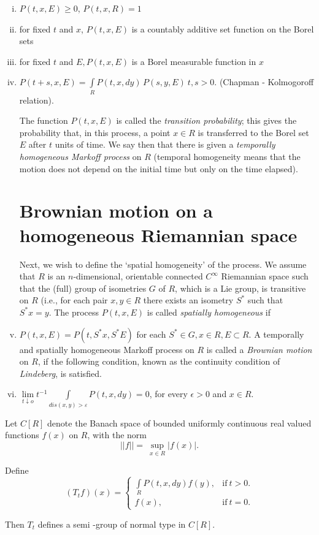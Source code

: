 \begin{enumerate} [i)]
\item $P(t, x, E) \ge 0$, $P(t, x, R) = 1$
\item for fixed $t$ and $x$, $P(t, x, E)$ is a countably additive set
 function on the Borel sets 
\item for fixed $t$ and $E, P(t, x, E)$ is a Borel measurable function
 in $x$ 
\item $P(t + s, x, E) = \int\limits_{R} P(t, x, dy)\, P(s, y, E) ~ t, s
 > 0$. (Chapman - Kolmogoroff relation). 

 The function $P(t, x, E)$ is called the \textit{transition
 probability}; this gives the probability that, in this process, a
 point $x \in R$ is transferred to the Borel set $E$ after $t$ units of
 time. We say then that there is given a \textit{temporally homogeneous
  Markoff process} on $R$ (temporal homogeneity means that the motion
 does not depend on the initial time but only on the time elapsed). 
 
\section{Brownian motion on a homogeneous Riemannian space}\label{chap11:sec2}
 
 Next, we wish to define the `spatial homogeneity' of the process. We
 assume that $R$ is an $n$-dimensional, orientable connected
 $C^\infty$\pageoriginale 
 Riemannian space such that the (full) group of isometries $G$ of $R$,
 which is a Lie group, is transitive on $R$ (i.e., for each pair $x, y
 \in R$ there exists an isometry $S^*$ such that $S^* x = y$. The process
 $P(t, x, E) $ is called \textit{spatially homogeneous} if 
 
\item $P (t, x, E) = P(t, S^*x, S^*E)$ for each $S^* \in G, x \in R,
 E \subset R$. A temporally and spatially homogeneous Markoff process
 on $R$ is called a \textit{Brownian motion} on $R$, if the following
 condition, known as the continuity condition of \textit{Lindeberg},
 is satisfied. 
\item $\lim\limits_{t \downarrow o} t^{-1} \int\limits_{dis (x, y)
 > \varepsilon} P(t, x, dy) = 0$, for every $\epsilon > 0$ and $x
 \in R$. 
\end{enumerate}

\begin{prop*}%
 Let $C [R]$ denote the Banach space of bounded uniformly continuous
 real valued functions $f(x)$ on $R$, with the norm 
 $$
 || f || = ~ \sup_{x \in R} | f(x) |.
 $$

 Define
 $$
 (T_t f) (x) =
 \begin{cases}
  \int\limits_R P(t, x, dy) f(y), &\text{if}~ t> 0.\\
  f(x), & \text{if}~ t = 0.
 \end{cases}
 $$
 
 Then $T_t$ defines a semi -group of normal type in $C[R]$.
\end{prop*}

